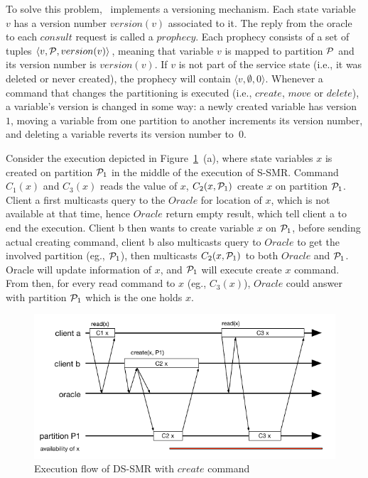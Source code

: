 
To solve this problem, \dssmr\ implements a versioning mechanism.
Each state variable $v$ has a version number $version(v)$ associated to it.
The reply from the oracle to each $consult$ request is called a $prophecy$. Each prophecy consists of a set of tuples $\langle v, \mathcal{P}, version(v) \rangle$, meaning that variable $v$ is mapped to partition $\mathcal{P}$ and its version number is $version(v)$.
If $v$ is not part of the service state (i.e., it was deleted or never created), the prophecy will contain $\langle v, \emptyset, 0 \rangle$.
Whenever a command that changes the partitioning is executed (i.e., $create$, $move$ or $delete$), a variable's version is changed in some way: a newly created variable has version $1$, moving a variable from one partition to another increments its version number, and deleting a variable reverts its version number to~$0$.

Consider the execution depicted in Figure~\ref{fig:read}~(a), where state variables $x$ is created on partition $\mathcal{P}_1$ in the middle of the execution of S-SMR. Command $C_1(x)$ and $C_3(x)$ reads the value of $x$, $C_2(x,\mathcal{P}_1)$ create $x$ on partition $\mathcal{P}_1$. Client a first multicasts query to the $Oracle$ for location of $x$, which is not available at that time, hence $Oracle$ return empty result, which tell client a to end the execution. Client b then wants to create variable $x$ on $\mathcal{P}_1$, before sending actual creating command, client b also multicasts query to $Oracle$ to get the involved partition (eg., $\mathcal{P}_1$), then multicasts $C_2(x,\mathcal{P}_1)$ to both $Oracle$ and $\mathcal{P}_1$. Oracle will update information of $x$, and $\mathcal{P}_1$ will execute create $x$ command. From then, for every read command to $x$ (eg., $C_3(x)$), $Oracle$ could answer with partition $\mathcal{P}_1$ which is the one holds $x$.

\begin{figure}
\begin{minipage}[b]{1.0\linewidth} %
\centering
      \includegraphics[width=0.6\linewidth]{figures/read_simple}
\end{minipage}
\centering
	\caption{Execution flow of DS-SMR with $create$ command}
\label{fig:read}
\end{figure}

